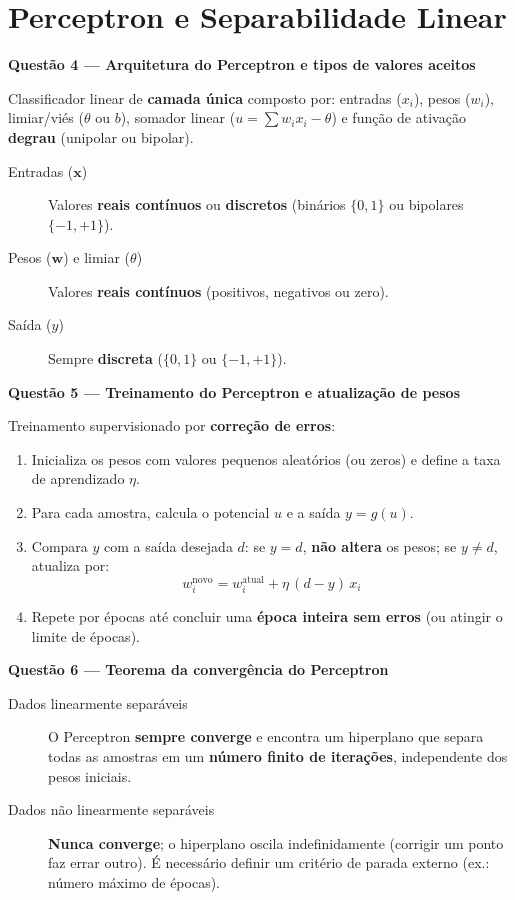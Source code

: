 \documentclass[10pt,a4paper]{article}
\newcommand{\questao}[2]{%
  \needspace{4\baselineskip}%
  \vspace{0.45em}\noindent
  {\color{azulufersa}\bfseries Questão #1 --- #2}\par\nopagebreak\vspace{0.15em}\noindent\ignorespaces%
}
\begin{document}
\section{Perceptron e Separabilidade Linear}

\questao{4}{Arquitetura do Perceptron e tipos de valores aceitos}
Classificador linear de \textbf{camada única} composto por: entradas ($x_i$), pesos ($w_i$), limiar/viés ($\theta$ ou $b$), somador linear ($u = \sum w_i x_i - \theta$) e função de ativação \textbf{degrau} (unipolar ou bipolar).
\begin{description}
  \item[Entradas ($\mathbf{x}$)] Valores \textbf{reais contínuos} ou \textbf{discretos} (binários $\{0,1\}$ ou bipolares $\{-1,+1\}$).
  \item[Pesos ($\mathbf{w}$) e limiar ($\theta$)] Valores \textbf{reais contínuos} (positivos, negativos ou zero).
  \item[Saída ($y$)] Sempre \textbf{discreta} ($\{0,1\}$ ou $\{-1,+1\}$).
\end{description}

\questao{5}{Treinamento do Perceptron e atualização de pesos}
Treinamento supervisionado por \textbf{correção de erros}:
\begin{enumerate}
  \item Inicializa os pesos com valores pequenos aleatórios (ou zeros) e define a taxa de aprendizado $\eta$.
  \item Para cada amostra, calcula o potencial $u$ e a saída $y = g(u)$.
  \item Compara $y$ com a saída desejada $d$: se $y = d$, \textbf{não altera} os pesos; se $y \neq d$, atualiza por:
  \[
    w_i^{\text{novo}} = w_i^{\text{atual}} + \eta\,(d - y)\,x_i
  \]
  \item Repete por épocas até concluir uma \textbf{época inteira sem erros} (ou atingir o limite de épocas).
\end{enumerate}

\questao{6}{Teorema da convergência do Perceptron}
\begin{description}
  \item[Dados linearmente separáveis] O Perceptron \textbf{sempre converge} e encontra um hiperplano que separa todas as amostras em um \textbf{número finito de iterações}, independente dos pesos iniciais.
  \item[Dados não linearmente separáveis] \textbf{Nunca converge}; o hiperplano oscila indefinidamente (corrigir um ponto faz errar outro). É necessário definir um critério de parada externo (ex.: número máximo de épocas).
\end{description}
\end{document}
